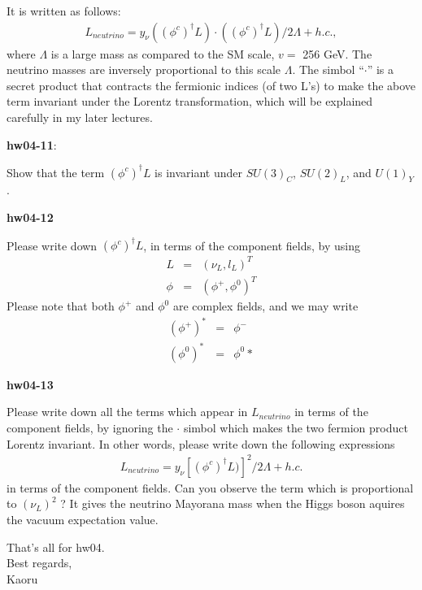 \documentclass[12pt]{article}
\begin{document}
  It is written as follows:
\begin{eqnarray}
    L_{neutrino}
  =
  y_\nu ((\phi^c)^\dagger L) \cdot ((\phi^c)^\dagger L)/2\Lambda
  + h.c.,
\end{eqnarray}
    where $\Lambda$ is a large mass as compared to the SM scale,
  $v =$ 256 GeV.  The neutrino masses are inversely proportional
  to this scale $\Lambda$.  The simbol ``$\cdot$'' is a secret
  product that contracts the fermionic indices (of two L's)
  to make the above term invariant under the Lorentz
  transformation, which will be explained carefully in my
  later lectures.

{\bf hw04-11}:

  Show that the term
 $ (\phi^c)^\dagger L$
  is invariant under $SU(3)_C$, $SU(2)_L$, and $U(1)_Y$.

{\bf hw04-12}

  Please write down $(\phi^c)^\dagger L$, in terms of the
  component fields, by using
\begin{eqnarray}
    L &=& ( \nu_L, l_L)^T\\
    \phi &=& ( \phi^+, \phi^0 )^T
\end{eqnarray}
  Please note that both $\phi^+$ and $\phi^0$ are complex fields,
  and we may write
\begin{eqnarray}
    (\phi^+)^* &=& \phi^-\\
  (\phi^0)^* &=& \phi^0*
\end{eqnarray}
  
{\bf hw04-13}

  Please write down all the terms which appear in $L_{neutrino}$
  in terms of the component fields, by ignoring the $\cdot$
  simbol which makes the two fermion product Lorentz invariant.
  In other words, please write down the following expressions
\begin{eqnarray}
    L_{neutrino}
  =
  y_\nu [ (\phi^c)^\dagger L) ]^2/2\Lambda + h.c.
\end{eqnarray}
    in terms of the component fields.  Can you observe the term
  which is proportional to
  $(\nu_L)^2$ ?
  It gives the neutrino Mayorana mass when the Higgs boson
  aquires the vacuum expectation value.

That's all for hw04.\\

Best regards,\\

Kaoru
\end{document}
